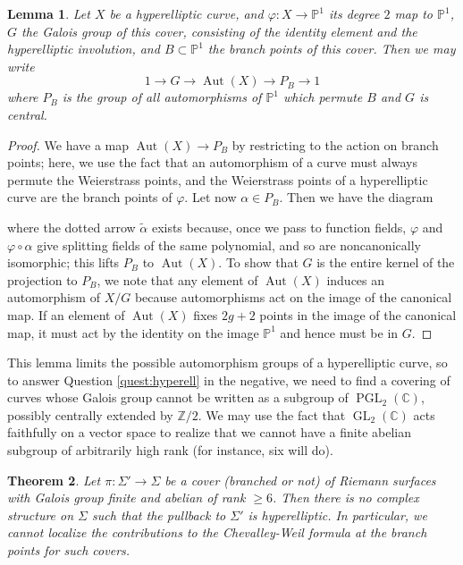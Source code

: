 \documentclass[11pt]{amsart}
\newtheorem{thm}{Theorem}
\newtheorem{lemma}[thm]{Lemma}
\numberwithin{thm}{section}
\begin{document}
\begin{lemma}
Let $X$ be a hyperelliptic curve, and $\varphi: X\rightarrow \mathbb{P}^1$ its degree $2$ map to $\mathbb{P}^1$, $G$ the Galois group of this cover, consisting of the identity element and the hyperelliptic involution, and $B\subset \mathbb{P}^1$ the branch points of this cover.  Then we may write
\[
1 \rightarrow G \rightarrow {\operatorname{Aut}}(X)\rightarrow P_B\rightarrow 1
\]
where $P_B$ is the group of all automorphisms of $\mathbb{P}^1$ which permute $B$ and $G$ is central.
\end{lemma}
\begin{proof}
We have a map ${\operatorname{Aut}}(X)\rightarrow P_B$ by restricting to the action on branch points; here, we use the fact that an automorphism of a curve must always permute the Weierstrass points, and the Weierstrass points of a hyperelliptic curve are the branch points of $\varphi$.  Let now $\alpha \in P_B$.  Then we have the diagram
\begin{center}
\mbox{}
\end{center}
where the dotted arrow $\tilde{\alpha}$ exists because, once we pass to function fields, $\varphi$ and $\varphi\circ\alpha$ give splitting fields of the same polynomial, and so are noncanonically isomorphic; this lifts $P_B$ to ${\operatorname{Aut}}(X)$.  To show that $G$ is the entire kernel of the projection to $P_B$, we note that any element of ${\operatorname{Aut}}(X)$ induces an automorphism of $X/G$ because automorphisms act on the image of the canonical map.  If an element of ${\operatorname{Aut}}(X)$ fixes $2g+2$ points in the image of the canonical map, it must act by the identity on the image $\mathbb{P}^1$ and hence must be in $G$.
\end{proof}
This lemma limits the possible automorphism groups of a hyperelliptic curve, so to answer Question \ref{quest:hyperell} in the negative, we need to find a covering of curves whose Galois group cannot be written as a subgroup of ${\operatorname{PGL}}_2({\mathbb{C}})$, possibly centrally extended by ${\mathbb{Z}}/2$.  We may use the fact that ${\operatorname{GL}}_2({\mathbb{C}})$ acts faithfully on a vector space to realize that we cannot have a finite abelian subgroup of arbitrarily high rank (for instance, six will do).
\begin{thm}
Let $\pi: \Sigma'\rightarrow \Sigma$ be a cover (branched or not) of Riemann surfaces with Galois group finite and abelian of rank $\geq 6$.  Then there is no complex structure on $\Sigma$ such that the pullback to $\Sigma'$ is hyperelliptic.  In particular, we cannot localize the contributions to the Chevalley-Weil formula at the branch points for such covers.
\end{thm}
\end{document}
